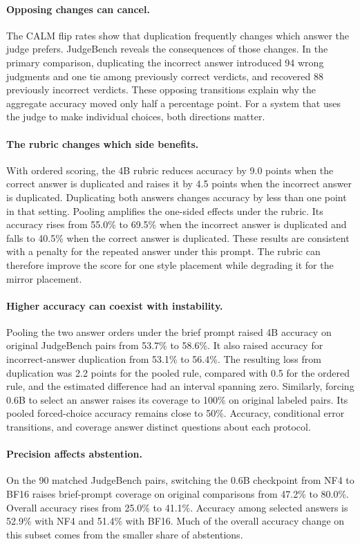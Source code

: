 \paragraph{Opposing changes can cancel.}
The CALM flip rates show that duplication frequently changes which
answer the judge prefers. JudgeBench reveals the consequences of
those changes. In the primary comparison, duplicating the incorrect
answer introduced 94 wrong judgments and one tie among previously
correct verdicts, and recovered 88 previously incorrect verdicts.
These opposing transitions explain why the aggregate accuracy moved
only half a percentage point. For a system that uses the judge to make
individual choices, both directions matter.

\paragraph{The rubric changes which side benefits.}
With ordered scoring, the 4B rubric reduces accuracy by 9.0 points
when the correct answer is duplicated and raises it by 4.5 points
when the incorrect answer is duplicated. Duplicating both answers
changes accuracy by less than one point in that setting. Pooling
amplifies the one-sided effects under the rubric. Its accuracy rises
from 55.0\% to 69.5\% when the incorrect answer is duplicated and
falls to 40.5\% when the correct answer is duplicated. These results
are consistent with a penalty for the repeated answer under this
prompt. The rubric can therefore improve the score for one style
placement while degrading it for the mirror placement.

\paragraph{Higher accuracy can coexist with instability.}
Pooling the two answer orders under the brief prompt raised 4B
accuracy on original JudgeBench pairs from 53.7\% to 58.6\%. It
also raised accuracy for incorrect-answer duplication from 53.1\%
to 56.4\%. The resulting loss from duplication was 2.2 points for
the pooled rule, compared with 0.5 for the ordered rule, and the
estimated difference had an interval spanning zero. Similarly,
forcing 0.6B to select an answer raises its coverage to 100\% on
original labeled pairs. Its pooled forced-choice accuracy remains
close to 50\%. Accuracy, conditional error transitions, and coverage
answer distinct questions about each protocol.

\paragraph{Precision affects abstention.}
On the 90 matched JudgeBench pairs, switching the 0.6B checkpoint from
NF4 to BF16 raises brief-prompt coverage on original comparisons from
47.2\% to 80.0\%. Overall accuracy rises from 25.0\% to 41.1\%.
Accuracy among selected answers is 52.9\% with NF4 and 51.4\%
with BF16. Much of the overall accuracy change on this subset
comes from the smaller share of abstentions.


